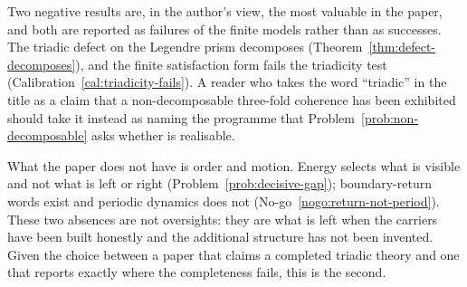 Two negative results are, in the author's view, the most valuable in the paper, and both are
reported as failures of the finite models rather than as successes.  The triadic defect on
the Legendre prism decomposes (Theorem~\ref{thm:defect-decomposes}), and the finite
satisfaction form fails the triadicity test (Calibration~\ref{cal:triadicity-fails}).  A
reader who takes the word ``triadic'' in the title as a claim that a non-decomposable
three-fold coherence has been exhibited should take it instead as naming the programme that
Problem~\ref{prob:non-decomposable} asks whether is realisable.

What the paper does not have is order and motion.  Energy selects what is visible and not what
is left or right (Problem~\ref{prob:decisive-gap}); boundary-return words exist and periodic
dynamics does not (No-go~\ref{nogo:return-not-period}).  These two absences are not
oversights: they are what is left when the carriers have been built honestly and the
additional structure has not been invented.  Given the choice between a paper that claims a
completed triadic theory and one that reports exactly where the completeness fails, this is
the second.
